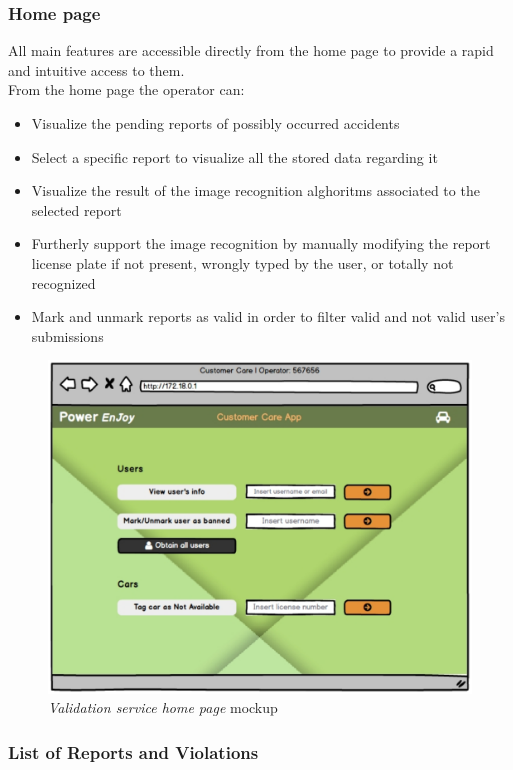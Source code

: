 \subsubsection{Home page}
All main features are accessible directly from the home page to provide a rapid and intuitive access to them. \\
From the home page the operator can:
\begin{itemize}
	\item Visualize the pending reports of possibly occurred accidents
	\item Select a specific report to visualize all the stored data regarding it
	\item Visualize the result of the image recognition alghoritms associated to the selected report
	\item Furtherly support the image recognition by manually modifying the report license plate if not present, wrongly typed by the user, or totally not recognized
	\item Mark and unmark reports as valid in order to ﬁlter valid and not valid user’s submissions
\end{itemize}
 
 \begin{figure}[ht!]
			\centering
			\includegraphics[width=0.8\linewidth]{mockups/customerCare1}
			\caption{
				\label{fig:cc1} 
				\emph{Validation service home page} mockup
			}
		\end{figure}

		\clearpage
\subsubsection{List of Reports and Violations}

